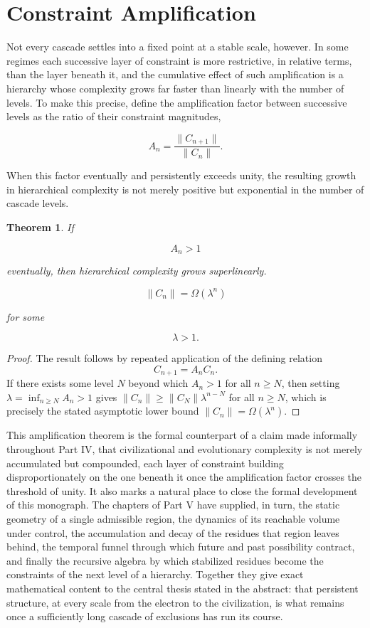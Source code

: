 \documentclass[11pt,oneside]{book}
\theoremstyle{plain}
\newtheorem{theorem}{Theorem}[chapter]
\theoremstyle{definition}
\theoremstyle{remark}
\begin{document}
\section{Constraint Amplification}

Not every cascade settles into a fixed point at a stable scale, however. In some regimes each successive layer of constraint is more restrictive, in relative terms, than the layer beneath it, and the cumulative effect of such amplification is a hierarchy whose complexity grows far faster than linearly with the number of levels. To make this precise, define the amplification factor between successive levels as the ratio of their constraint magnitudes,

\[
A_n
=
\frac{
\|C_{n+1}\|
}{
\|C_n\|
}.
\]

When this factor eventually and persistently exceeds unity, the resulting growth in hierarchical complexity is not merely positive but exponential in the number of cascade levels.

\begin{theorem}
If

\[
A_n>1
\]

eventually, then hierarchical complexity grows superlinearly.

\[
\|C_n\|
=
\Omega(\lambda^n)
\]

for some

\[
\lambda>1.
\]
\end{theorem}

\begin{proof}
The result follows by repeated application of the defining relation
\[
C_{n+1}=A_nC_n.
\]
If there exists some level \(N\) beyond which \(A_n>1\) for all \(n\ge N\), then setting \(\lambda=\inf_{n\ge N}A_n>1\) gives \(\|C_n\|\ge\|C_N\|\lambda^{n-N}\) for all \(n\ge N\), which is precisely the stated asymptotic lower bound \(\|C_n\|=\Omega(\lambda^n)\).
\end{proof}

This amplification theorem is the formal counterpart of a claim made informally throughout Part IV, that civilizational and evolutionary complexity is not merely accumulated but compounded, each layer of constraint building disproportionately on the one beneath it once the amplification factor crosses the threshold of unity. It also marks a natural place to close the formal development of this monograph. The chapters of Part V have supplied, in turn, the static geometry of a single admissible region, the dynamics of its reachable volume under control, the accumulation and decay of the residues that region leaves behind, the temporal funnel through which future and past possibility contract, and finally the recursive algebra by which stabilized residues become the constraints of the next level of a hierarchy. Together they give exact mathematical content to the central thesis stated in the abstract: that persistent structure, at every scale from the electron to the civilization, is what remains once a sufficiently long cascade of exclusions has run its course.
\end{document}
